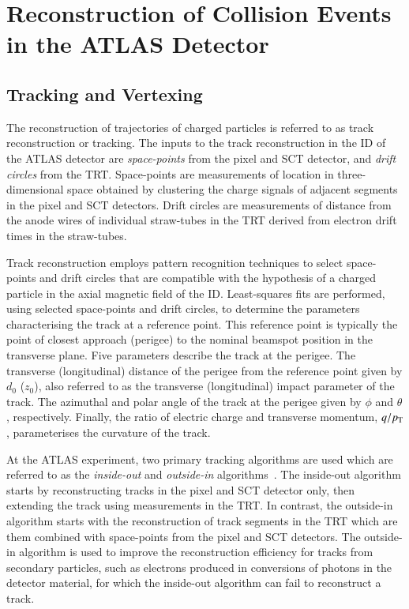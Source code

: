 \section{Reconstruction of Collision Events in the ATLAS Detector}%
\label{sec:object_reco_at_atlas}



\subsection{Tracking and Vertexing}

The reconstruction of trajectories of charged particles is referred to as track
reconstruction or tracking. The inputs to the track reconstruction in the ID of
the ATLAS detector are \emph{space-points} from the pixel and SCT detector, and
\emph{drift circles} from the TRT. Space-points are measurements of location in
three-dimensional space obtained by clustering the charge signals of adjacent
segments in the pixel and SCT detectors. Drift circles are measurements of
distance from the anode wires of individual straw-tubes in the TRT derived from
electron drift times in the straw-tubes.

Track reconstruction employs pattern recognition techniques to select
space-points and drift circles that are compatible with the hypothesis of a
charged particle in the axial magnetic field of the ID. Least-squares fits are
performed, using selected space-points and drift circles, to determine the
parameters characterising the track at a reference point. This reference point
is typically the point of closest approach (perigee) to the nominal beamspot
position in the transverse plane. Five parameters describe the track at the
perigee. The transverse (longitudinal) distance of the perigee from the
reference point given by $d_0$ ($z_0$), also referred to as the transverse
(longitudinal) impact parameter of the track. The azimuthal and polar angle of
the track at the perigee given by $\phi$ and $\theta$, respectively. Finally,
the ratio of electric charge and transverse momentum, $q / p_{\text{T}}$, parameterises
the curvature of the track.

At the ATLAS experiment, two primary tracking algorithms are used which are
referred to as the \emph{inside-out} and \emph{outside-in}
algorithms~\cite{Cornelissen:2007vba,Salzburger:2015sgq,PERF-2015-08}. The
inside-out algorithm starts by reconstructing tracks in the pixel and SCT
detector only, then extending the track using measurements in the TRT. In
contrast, the outside-in algorithm starts with the reconstruction of track
segments in the TRT which are them combined with space-points from the pixel and
SCT detectors. The outside-in algorithm is used to improve the reconstruction
efficiency for tracks from secondary particles, such as electrons produced in
conversions of photons in the detector material, for which the inside-out
algorithm can fail to reconstruct a track.

